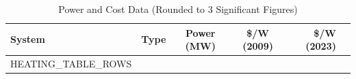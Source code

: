 \begin{table}[htbp]
    \centering
    \begin{tabular}{lcccrr}
        \hline
        System & Type & Power (MW) & \$/W (2009) & \$/W (2023) \\
        \hline
HEATING_TABLE_ROWS
        \hline
    \end{tabular}
    \caption{Power and Cost Data (Rounded to 3 Significant Figures)}
    \label{tab:supp_heat}
\end{table}

